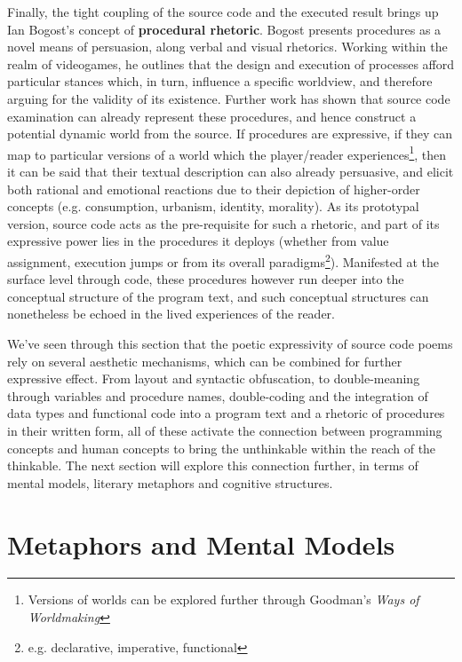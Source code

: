 \documentclass{article}
\begin{document}
Finally, the tight coupling of the source code and the executed result brings up Ian Bogost's concept of \textbf{procedural rhetoric}\cite{bogost_rhetoric_2007}. Bogost presents procedures as a novel means of persuasion, along verbal and visual rhetorics. Working within the realm of videogames, he outlines that the design and execution of processes afford particular stances which, in turn, influence a specific worldview, and therefore arguing for the validity of its existence. Further work has shown that source code examination can already represent these procedures, and hence construct a potential dynamic world from the source\cite{tirrell_dumb_2012}. If procedures are expressive, if they can map to particular versions of a world which the player/reader experiences\footnote{Versions of worlds can be explored further through Goodman's \emph{Ways of Worldmaking}}, then it can be said that their textual description can also already persuasive, and elicit both rational and emotional reactions due to their depiction of higher-order concepts (e.g. consumption, urbanism, identity, morality). As its prototypal version, source code acts as the pre-requisite for such a rhetoric, and part of its expressive power lies in the procedures it deploys (whether from value assignment, execution jumps or from its overall paradigms\footnote{e.g. declarative, imperative, functional}). Manifested at the surface level through code, these procedures however run deeper into the conceptual structure of the program text, and such conceptual structures can nonetheless be echoed in the lived experiences of the reader.

We've seen through this section that the poetic expressivity of source code poems rely on several aesthetic mechanisms, which can be combined for further expressive effect. From layout and syntactic obfuscation, to double-meaning through variables and procedure names, double-coding and the integration of data types and functional code into a program text and a rhetoric of procedures in their written form, all of these activate the connection between programming concepts and human concepts to bring the unthinkable within the reach of the thinkable. The next section will explore this connection further, in terms of mental models, literary metaphors and cognitive structures.

\pagebreak

\section{Metaphors and Mental Models}
\end{document}
